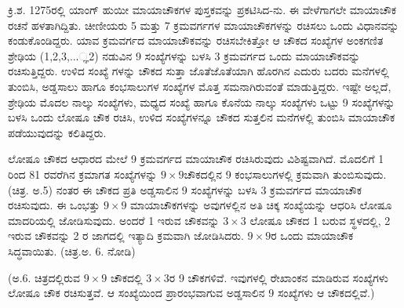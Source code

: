 ಕ್ರಿ.ಶ. 1275ರಲ್ಲಿ ಯಾಂಗ್ ಹುಯೀ ಮಾಯಾಚೌಕಗಳ ಪುಸ್ತಕವನ್ನು ಪ್ರಕಟಿಸಿದ-ನು. ಈ ವೇಳೆಗಾಗಲೇ ಮಾಯಾಚೌಕ ರಚನೆ ಹಳತಾಗಿದ್ದಿತು. ಚೀಣೀಯರು 5 ಮತ್ತು 7 ಕ್ರಮವರ್ಗಗಳ ಮಾಯಾಚೌಕಗಳನ್ನು ರಚಿಸಲು ಒಂದು ವಿಧಾನವನ್ನು ಕಂಡುಕೊಂಡಿದ್ದರು. ಯಾವ ಕ್ರಮವರ್ಗದ ಮಾಯಾಚೌಕವನ್ನು ರಚಿಸಬೇಕಿತ್ತೋ ಆ ಚೌಕದ ಸಂಖ್ಯೆಗಳ ಅಂಕಗಣಿತ ಶ್ರೇಢಿಯ (1,2,3,...್ಞ2) ನಡುವಿನ 9 ಸಂಖ್ಯೆಗಳನ್ನು ಬಳಸಿ 3 ಕ್ರಮವರ್ಗದ ಒಂದು ಮಾಯಾಚೌಕವನ್ನು ರಚಿಸುತ್ತಿದ್ದರು. ಉಳಿದ ಸಂಖ್ಯೆ ಗಳನ್ನು ಚೌಕದ ಸುತ್ತಾ ಜೊತೆಜೊತೆಯಾಗಿ ಹೊರಗಿನ ಎದುರು ಬದರು ಮನೆಗಳಲ್ಲಿ ತುಂಬಿಸಿ, ಅಡ್ಡಸಾಲು ಹಾಗೂ ಕಂಭಸಾಲುಗಳ ಸಂಖ್ಯೆಗಳ ಮೊತ್ತ ಸಮನಾಗಿರುವಂತೆ ಮಾಡುತ್ತಿದ್ದರು. ಇಷ್ಟೇ ಅಲ್ಲದೆ, ಶ್ರೇಢಿಯ ಮೊದಲ ನಾಲ್ಕು ಸಂಖ್ಯೆಗಳು, ಮಧ್ಯದ ಸಂಖ್ಯೆ ಹಾಗೂ ಕೊನೆಯ ನಾಲ್ಕು ಸಂಖ್ಯೆಗಳು ಒಟ್ಟು 9 ಸಂಖ್ಯೆಗಳನ್ನು ಬಳಸಿ ಒಂದು ಲೋಷೂ ಚೌಕ ರಚಿಸಿ, ಉಳಿದ ಸಂಖ್ಯೆಗಳನ್ನೂ ಚೌಕದ ಸುತ್ತಲಿನ ಮನೆಗಳಲ್ಲಿ ತುಂಬಿಸಿ ಮಾಯಾಚೌಕ ಪಡೆಯುವುದನ್ನು ಕಲಿತಿದ್ದರು.

ಲೋಷೂ ಚೌಕದ ಆಧಾರದ ಮೇಲೆ 9 ಕ್ರಮವರ್ಗದ ಮಾಯಾಚೌಕ ರಚಿಸಿರುವುದು ವಿಶಿಷ್ಟವಾಗಿದೆ. ಮೊದಲಿಗೆ 1 ರಿಂದ 81 ರವರೆಗಿನ ಕ್ರಮಾಗತ ಸಂಖ್ಯೆಗಳನ್ನು $9 \times 9$ಚೌಕದಲ್ಲಿನ 9 ಕಂಭಸಾಲುಗಳಲ್ಲಿ ಕ್ರಮವಾಗಿ ತುಂಬಿಸುವುದು. (ಚಿತ್ರ. ಅ.5) ನಂತರ ಈ ಚೌಕದ ಪ್ರತಿ ಅಡ್ಡಸಾಲಿನ 9 ಸಂಖ್ಯೆಗಳನ್ನು ಬಳಸಿ 3 ಕ್ರಮವರ್ಗದ ಮಾಯಾಚೌಕ ರಚಿಸುವುದು. ಈ ಒಂಭತ್ತು $9 \times 9$ ಮಾಯಾಚೌಕಗಳನ್ನು ಅವುಗಳಲ್ಲಿನ ಅತಿ ಚಿಕ್ಕ ಸಂಖ್ಯೆಯನ್ನು ಆಧರಿಸಿ ಲೋಷೂ ಮಾದರಿಯಲ್ಲಿ ಜೋಡಿಸುವುದು. ಅಂದರೆ 1 ಇರುವ ಚೌಕವನ್ನು $3 \times 3$ ಲೋಷೂ ಚೌಕದ 1 ಬರುವ ಸ್ಥಳದಲ್ಲಿ, 2 ಇರುವ ಚೌಕವನ್ನು 2 ರ ಜಾಗದಲ್ಲಿ ಇತ್ಯಾದಿ ಕ್ರಮವಾಗಿ ಜೋಡಿಸಿದರು. $9 \times 9$ರ ಒಂದು ಮಾಯಾಚೌಕ ಸಿದ್ಧವಾಯಿತು. (ಚಿತ್ರ.ಅ. 6. ನೋಡಿ)

(ಅ.6. ಚಿತ್ರದಲ್ಲಿರುವ $9 \times 9$ ಚೌಕದಲ್ಲಿ $3 \times 3$ರ 9 ಚೌಕಗಳಿವೆ. ಇವುಗಳಲ್ಲಿ ರೇಖಾಂಕನ ಮಾಡಿರುವ ಸಂಖ್ಯೆಗಳು ಲೋಷೂ ಚೌಕ ರಚಿಸುತ್ತವೆ. ಆ ಸಂಖ್ಯೆಯಿಂದ ಪ್ರಾರಂಭವಾಗುವ ಅಡ್ಡಸಾಲಿನ 9 ಸಂಖ್ಯೆಗಳು ಆ ಚೌಕದಲ್ಲಿವೆ.)

